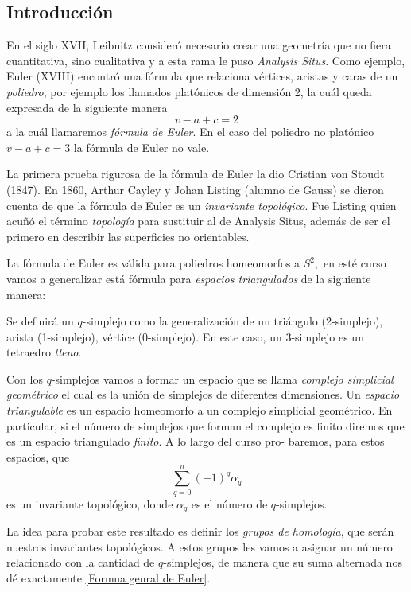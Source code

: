 \begin{center}
    \section{Introducción}
\end{center}
En el siglo XVII, Leibnitz consideró necesario crear una geometría que no fiera cuantitativa, sino cualitativa y a esta rama le puso \textit{Analysis Situs}. Como ejemplo, Euler (XVIII) encontró una fórmula que relaciona vértices, aristas y caras de un \textit{poliedro}, por ejemplo los llamados platónicos de dimensión 2, la cuál queda expresada de la siguiente manera
\[
v-a+c=2
\]
a la cuál llamaremos \textit{fórmula de Euler}. En el caso del poliedro no platónico
$v-a+c=3$ la fórmula de Euler no vale. 

La primera prueba rigurosa de la fórmula de Euler la dio Cristian von Stoudt (1847). En 1860, Arthur Cayley y Johan Listing (alumno de Gauss) se dieron cuenta de que la fórmula de Euler es un \textit{invariante topológico}. Fue  Listing quien acuñó el término \textit{topología} para sustituir al de {Analysis Situs}, además de ser el primero en describir las superficies no orientables.

La fórmula de Euler es válida para poliedros homeomorfos a $S^2,$ en esté curso vamos a generalizar está fórmula para \textit{espacios triangulados} de la siguiente manera:

Se definirá un $q$-simplejo como la generalización de un triángulo (2-simplejo), arista (1-simplejo), vértice (0-simplejo). En este caso, un 3-simplejo es un tetraedro \textit{lleno}.

Con los $q$-simplejos vamos a formar un espacio que se llama \textit{complejo simplicial geométrico} el cual es la unión de simplejos de diferentes dimensiones. Un \textit{espacio triangulable} es un espacio homeomorfo a un complejo simplicial geométrico. En particular,  si el número de simplejos que forman el complejo es finito diremos que es un espacio triangulado \textit{finito}. A lo largo del curso pro- baremos, para estos espacios, que
\begin{equation}
\label{Formua genral de Euler}
    \sum_{q=0}^n(-1)^q\alpha_q
\end{equation}
es un invariante topológico, donde $\alpha_q$ es el número de $q$-simplejos. 

La idea para probar este resultado es definir los \textit{grupos de homología}, que serán nuestros invariantes topológicos. A estos grupos les vamos a asignar un número relacionado con la cantidad de $q$-simplejos, de manera que su suma alternada nos dé exactamente \ref{Formua genral de Euler}.

